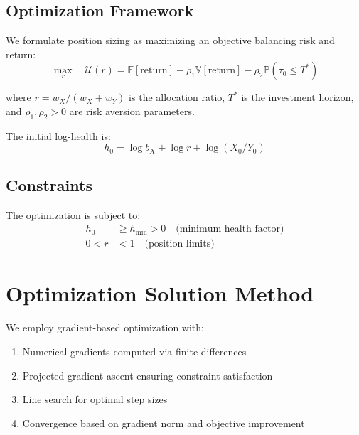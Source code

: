 \documentclass{article}
\theoremstyle{definition}
\begin{document}
\subsection{Optimization Framework}

We formulate position sizing as maximizing an objective balancing risk and return:
\begin{equation}
\max_{r} \quad \mathcal{U}(r) = \mathbb{E}[\text{return}] - \rho_1 \mathbb{V}[\text{return}] - \rho_2 \mathbb{P}(\tau_0 \leq T^*) \label{eq:objective_portfolio}
\end{equation}

where $r = w_X/(w_X + w_Y)$ is the allocation ratio, $T^*$ is the investment horizon, and $\rho_1, \rho_2 > 0$ are risk aversion parameters.

The initial log-health is:
\begin{equation}
h_0 = \log b_X + \log r + \log(X_0/Y_0) \label{eq:initial_health_portfolio}
\end{equation}

\subsection{Constraints}

The optimization is subject to:
\begin{align}
h_0 &\geq h_{\min} > 0 \quad \text{(minimum health factor)} \\
0 < r &< 1 \quad \text{(position limits)}
\end{align}

\section{Optimization Solution Method}

We employ gradient-based optimization with:
\begin{enumerate}
    \item Numerical gradients computed via finite differences
    \item Projected gradient ascent ensuring constraint satisfaction  
    \item Line search for optimal step sizes
    \item Convergence based on gradient norm and objective improvement
\end{enumerate}
\end{document}
